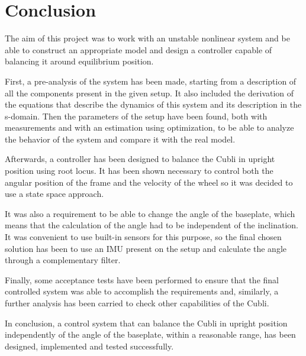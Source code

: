 \chapter{Conclusion}

The aim of this project was to work with an unstable nonlinear system and be able to construct an appropriate model and design a controller capable of balancing it around equilibrium position.

First, a pre-analysis of the system has been made, starting from a description of all the components present in the given setup. It also included the derivation of the equations that describe the dynamics of this system and its description in the s-domain. Then the parameters of the setup have been found, both with measurements and with an estimation using optimization, to be able to analyze the behavior of the system and compare it with the real model.

Afterwards, a controller has been designed to balance the Cubli in upright position using root locus. It has been shown necessary to control both the angular position of the frame and the velocity of the wheel so it was decided to use a state space approach.

It was also a requirement to be able to change the angle of the baseplate, which means that the calculation of the angle had to be independent of the inclination. It was convenient to use built-in sensors for this purpose, so the final chosen solution has been to use an IMU present on the setup and calculate the angle through a complementary filter.

Finally, some acceptance tests have been performed to ensure that the final controlled system was able to accomplish the requirements and, similarly, a further analysis has been carried to check other capabilities of the Cubli.

In conclusion, a control system that can balance the Cubli in upright position independently of the angle of the baseplate, within a reasonable range, has been designed, implemented and tested successfully.